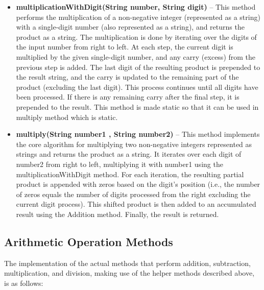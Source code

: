 \documentclass[a4paper,12pt]{article}
\begin{document}
\begin{itemize}
    \item \textbf{multiplicationWithDigit(String number, String digit)} -- This method performs the multiplication of a non-negative integer (represented as a string) with a single-digit number (also represented as a string), and returns the product as a string. The multiplication is done by iterating over the digits of the input number from right to left. At each step, the current digit is multiplied by the given single-digit number, and any carry (excess) from the previous step is added. The last digit of the resulting product is prepended to the result string, and the carry is updated to the remaining part of the product (excluding the last digit). This process continues until all digits have been processed. If there is any remaining carry after the final step, it is prepended to the result. This method is made static so that it can be used in multiply method which is static.\\

    
    \item \textbf{multiply(String number1 , String number2)} -- This method implements the core algorithm for multiplying two non-negative integers represented as strings and returns the product as a string. It iterates over each digit of number2 from right to left, multiplying it with number1 using the multiplicationWithDigit method. For each iteration, the resulting partial product is appended with zeros based on the digit’s position (i.e., the number of zeros equals the number of digits processed from the right excluding the current digit process). This shifted product is then added to an accumulated result using the Addition method. Finally, the result is returned.\\
    
\end{itemize}

\subsection{Arithmetic Operation Methods}

The implementation of the actual methods that perform addition, subtraction, multiplication, and division, making use of the helper methods described above, is as follows:\\
\end{document}
